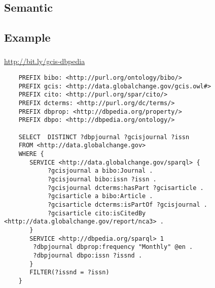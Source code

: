 \documentclass{beamer}
\begin{document}
\subsection{Semantic}

\subsection{Example}
\begin{frame}[fragile]
    \frametitle{\insertsubsectionhead}
     \url{http://bit.ly/gcis-dbpedia}
\begin{tiny}
\begin{Verbatim}
    PREFIX bibo: <http://purl.org/ontology/bibo/>
    PREFIX gcis: <http://data.globalchange.gov/gcis.owl#>
    PREFIX cito: <http://purl.org/spar/cito/>
    PREFIX dcterms: <http://purl.org/dc/terms/>
    PREFIX dbprop: <http://dbpedia.org/property/>
    PREFIX dbpo: <http://dbpedia.org/ontology/>

    SELECT  DISTINCT ?dbpjournal ?gcisjournal ?issn
    FROM <http://data.globalchange.gov>
    WHERE {
       SERVICE <http://data.globalchange.gov/sparql> {
            ?gcisjournal a bibo:Journal .
            ?gcisjournal bibo:issn ?issn .
            ?gcisjournal dcterms:hasPart ?gcisarticle .
            ?gcisarticle a bibo:Article .
            ?gcisarticle dcterms:isPartOf ?gcisjournal .
            ?gcisarticle cito:isCitedBy <http://data.globalchange.gov/report/nca3> .
       }
       SERVICE <http://dbpedia.org/sparql> 1
        ?dbpjournal dbprop:frequency "Monthly" @en .
        ?dbpjournal dbpo:issn ?issnd .
       }
       FILTER(?issnd = ?issn)
    }
\end{Verbatim}
\end{tiny}

\end{frame}
\end{document}
